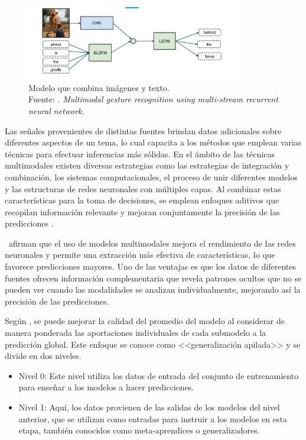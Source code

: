 \begin{figure}[!ht]
	\begin{center}
		\includegraphics[width=0.85\textwidth]{2/figures/multimodal_network.png}
		\caption[Modelo que combina imágenes y texto]{Modelo que combina imágenes y texto.\\
		Fuente: \cite{tec_nishida2015multimodal}. \textit{Multimodal gesture recognition using multi-stream recurrent neural network}.}
		\label{2:fig57}
	\end{center}
\end{figure}

Las señales provenientes de distintas fuentes brindan datos adicionales sobre diferentes aspectos de un tema, lo cual capacita a los métodos que emplean varias técnicas para efectuar inferencias más sólidas. En el ámbito de las técnicas multimodales existen diversas estrategias como las estrategias de integración y combinación, los sistemas computacionales, el proceso de unir diferentes modelos y las estructuras de redes neuronales con múltiples capas. Al combinar estas características para la toma de decisiones, se emplean enfoques aditivos que recopilan información relevante y mejoran conjuntamente la precisión de las predicciones \cite{bk_deng2018deeplearningnlp}.

\cite{tec_baheti2020introduction_mdl} afirman que el uso de modelos multimodales mejora el rendimiento de las redes neuronales y permite una extracción más efectiva de características, lo que favorece predicciones mayores. Uno de las ventajas es que los datos de diferentes fuentes ofrecen información complementaria que revela patrones ocultos que no se pueden ver cuando las modalidades se analizan individualmente, mejorando así la precisión de las predicciones.

Según \cite{tec_brownlee2018stacked_models}, se puede mejorar la calidad del promedio del modelo al considerar de manera ponderada las aportaciones individuales de cada submodelo a la predicción global. Este enfoque se conoce como <<generalización apilada>> y se divide en dos niveles.

\begin{itemize}
    \item Nivel 0: Este nivel utiliza los datos de entrada del conjunto de entrenamiento para enseñar a los modelos a hacer predicciones.
    \item Nivel 1: Aquí, los datos provienen de las salidas de los modelos del nivel anterior, que se utilizan como entradas para instruir a los modelos en esta etapa, también conocidos como meta-aprendices o generalizadores.
\end{itemize}

